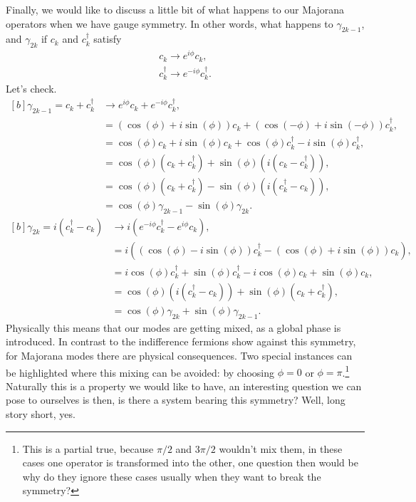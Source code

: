 Finally, we would like to discuss a little bit of what happens to our Majorana operators when we have gauge symmetry. In other words, what happens to $\gamma_{2k-1}$, and $\gamma_{2k}$ if $c_k$ and $c_k^\dagger$ satisfy
\begin{eqnarray}
    c_k \rightarrow e^{i\phi}c_k,\nonumber\\
    c_k^\dagger \rightarrow e^{-i\phi}c_k^\dagger.\nonumber
\end{eqnarray}
Let's check.
\begin{equation}
    \begin{aligned}[b]
        \gamma_{2k-1} = c_k + c_k^\dagger &\rightarrow e^{i\phi}c_k + e^{-i\phi}c_k^\dagger,\\
        &= (\cos(\phi) + i\sin(\phi))c_k + (\cos(-\phi) + i \sin(-\phi))c_k^\dagger,\\
        &= \cos(\phi)c_k + i\sin(\phi)c_k + \cos(\phi)c_k^\dagger - i \sin(\phi)c_k^\dagger,\\
        &= \cos(\phi)(c_k + c_k^\dagger) +\sin(\phi)(i(c_k -c_k^\dagger)),\\
        &= \cos(\phi)(c_k + c_k^\dagger) -\sin(\phi)(i(c_k^\dagger -c_k)),\\
        &= \cos(\phi)\gamma_{2k-1} -\sin(\phi)\gamma_{2k}.\label{mix1}
    \end{aligned}
\end{equation}
\begin{equation}
    \begin{aligned}[b]
        \gamma_{2k} = i(c_k^\dagger - c_k) &\rightarrow i(e^{-i\phi}c_k^\dagger - e^{i\phi}c_k),\\
        &= i((\cos(\phi) - i\sin(\phi))c_k^\dagger - (\cos(\phi) + i\sin(\phi))c_k),\\
        &= i\cos(\phi)c_k^\dagger  + \sin(\phi)c_k^\dagger - i\cos(\phi)c_k + \sin(\phi)c_k,\\
        &= \cos(\phi)(i(c_k^\dagger-c_k)) + \sin(\phi)(c_k + c_k^\dagger),\\\
        &= \cos(\phi)\gamma_{2k} + \sin(\phi)\gamma_{2k-1}.\label{mix2}
    \end{aligned}
\end{equation}
Physically this means that our modes are getting mixed, as a global phase is introduced. In contrast to the indifference fermions show against this symmetry, for Majorana modes there are physical consequences. Two special instances can be highlighted where this mixing can be avoided: by choosing $\phi=0$ or $\phi=\pi$.\footnote{This is a partial true, because $\pi/2$ and $3\pi/2$ wouldn't mix them, in these cases one operator is transformed into the other, one question then would be why do they ignore these cases usually when they want to break the symmetry?}\label{quest2} Naturally this is a property we would like to have, an interesting question we can pose to ourselves is then, is there a system bearing this symmetry? Well, long story short, yes.\\
